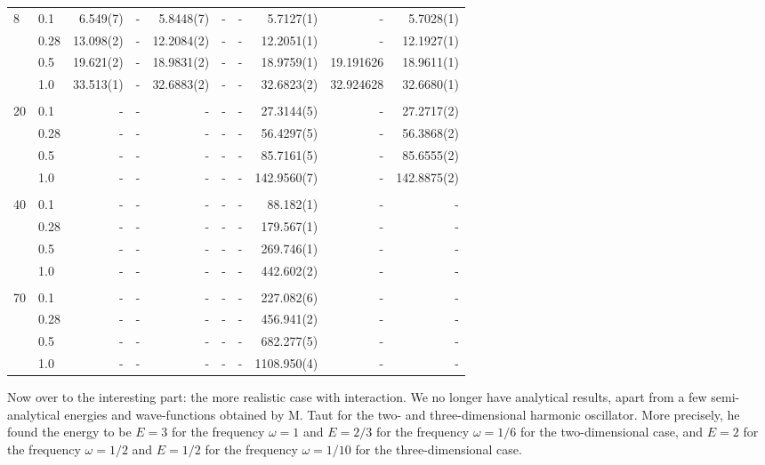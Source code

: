 \begin{landscape}
\begin{table} [H]
\begin{tabularx}{\hsize}{l:l|RRRRRRRR}
		8 & 0.1 & 6.549(7) & - & 5.8448(7) & - & - & 5.7127(1) & - & 5.7028(1) \\ 
		& 0.28 & 13.098(2) & - & 12.2084(2) & - & - & 12.2051(1) & - & 12.1927(1) \\
		& 0.5 & 19.621(2) & - & 18.9831(2) & - & - & 18.9759(1) & 19.191626 & 18.9611(1) \\
		& 1.0 & 33.513(1) & - & 32.6883(2) & - & - & 32.6823(2) & 32.924628 & 32.6680(1) \\ \hdashline \\
		
		20 & 0.1 & - & - & - & - & - & 27.3144(5) & - & 27.2717(2) \\ 
		& 0.28 & - & - & - & - & - & 56.4297(5) & - & 56.3868(2) \\
		& 0.5 & - & - & - & - & - & 85.7161(5) & - & 85.6555(2) \\
		& 1.0 & - & - & - & - & - & 142.9560(7) & - & 142.8875(2) \\ \hdashline \\
		
		40 & 0.1 & - & - & - & - & - & 88.182(1) & - & - \\ 
		& 0.28 & - & - & - & - & - & 179.567(1) & - & - \\
		& 0.5 & - & - & - & - & - & 269.746(1) & - & - \\
		& 1.0 & - & - & - & - & - & 442.602(2) & - & - \\ \hdashline \\
		
		70 & 0.1 & - & - & - & - & - & 227.082(6) & - & - \\ 
		& 0.28 & - & - & - & - & - & 456.941(2) & - & - \\
		& 0.5 & - & - & - & - & - & 682.277(5) & - & - \\
		& 1.0 & - & - & - & - & - & 1108.950(4) & - & - \\ \hline\hline
	\end{tabularx}
\end{table}
\end{landscape}

Now over to the interesting part: the more realistic case with interaction. We no longer have analytical results, apart from a few semi-analytical energies and wave-functions obtained by M. Taut for the two- and three-dimensional harmonic oscillator. More precisely, he found the energy to be $E=3$ for the frequency $\omega=1$ and $E=2/3$ for the frequency $\omega=1/6$ for the two-dimensional case, and $E=2$ for the frequency $\omega=1/2$ and $E=1/2$ for the frequency $\omega=1/10$ for the three-dimensional case. \cite{taut_two_1993}\cite{taut_two_1994}

